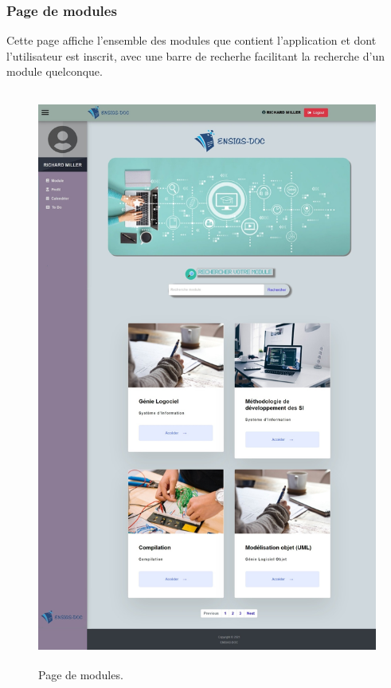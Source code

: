 \documentclass{article}
\begin{document}
{\subsubsection{Page de modules}{Cette page affiche l'ensemble des modules que contient l'application et dont l'utilisateur est inscrit, avec une barre de recherhe facilitant la recherche d'un module quelconque.
}
\begin{figure}[H]
    \centering
    \includegraphics[width=17cm,height=19cm]{module.jpeg}
    \caption{Page de modules.}
    \label{Page de modules.}
\end{figure}

}
\end{document}
